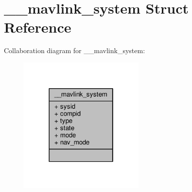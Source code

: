 \hypertarget{struct____mavlink__system}{\section{\+\_\+\+\_\+mavlink\+\_\+system Struct Reference}
\label{struct____mavlink__system}
}


Collaboration diagram for \+\_\+\+\_\+mavlink\+\_\+system\+:
\nopagebreak
\begin{figure}[H]
\begin{center}
\leavevmode
\includegraphics[width=178pt]{struct____mavlink__system__coll__graph}
\end{center}
\end{figure}
